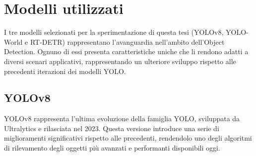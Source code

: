 \section{Modelli utilizzati}
I tre modelli selezionati per la sperimentazione di questa tesi (YOLOv8, YOLO-World e RT-DETR) rappresentano l'avanguardia nell'ambito dell'Object Detection. Ognuno di essi presenta caratteristiche uniche che li rendono adatti a diversi scenari applicativi, rappresentando un ulteriore sviluppo rispetto alle precedenti iterazioni dei modelli YOLO.

\subsection{YOLOv8}
YOLOv8 rappresenta l'ultima evoluzione della famiglia YOLO, sviluppata da Ultralytics e rilasciata nel 2023\cite{26}. Questa versione introduce una serie di miglioramenti significativi rispetto alle precedenti, rendendolo uno degli algoritmi di rilevamento degli oggetti più avanzati e performanti disponibili oggi.

